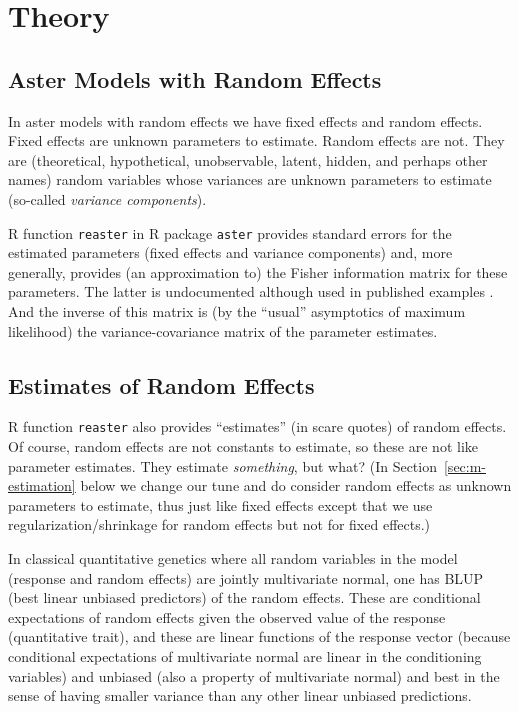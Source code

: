 \documentclass[11pt]{article}
\let\code=\texttt
\begin{document}
\section{Theory}

\subsection{Aster Models with Random Effects}

In aster models with random effects \citep*{reaster} we have fixed effects
and random effects.  Fixed effects are unknown parameters to estimate.
Random effects are not.  They are (theoretical, hypothetical, unobservable,
latent, hidden, and perhaps other names) random variables whose variances are
unknown parameters to estimate (so-called \emph{variance components}).

R function \code{reaster} in R package \code{aster} \citep{aster-package}
provides standard errors for the estimated parameters (fixed effects and
variance components) and, more generally, provides (an approximation to)
the Fisher information matrix for these parameters.  The latter is
undocumented although used in published examples
\citep[Supplementary material Section~12.3.1]{zenodo}.  And the inverse
of this matrix is (by the ``usual'' asymptotics of maximum likelihood)
the variance-covariance matrix of the parameter estimates.

\subsection{Estimates of Random Effects}

R function \code{reaster} also provides ``estimates'' (in scare quotes)
of random effects.  Of course, random effects are not constants to estimate,
so these are not like parameter estimates.  They estimate \emph{something}, but
what?  (In Section~\ref{sec:m-estimation} below we change our tune and do
consider random effects as unknown parameters to estimate, thus just like
fixed effects except that we use regularization/shrinkage for random
effects but not for fixed effects.)

In classical quantitative genetics where all random variables in the model
(response and random effects) are jointly multivariate normal, one has
BLUP (best linear unbiased predictors) of the random effects.  These
are conditional expectations of random effects given the observed value
of the response (quantitative trait), and these are linear functions
of the response vector (because conditional expectations of multivariate
normal are linear in the conditioning variables) and unbiased
(also a property of multivariate normal)
and best in the sense of having smaller variance than any other linear
unbiased predictions.
\end{document}
